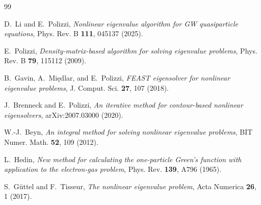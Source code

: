\documentclass[12pt,a4paper]{article}
\theoremstyle{definition}
\begin{document}
\begin{thebibliography}{99}

D.~Li and E.~Polizzi,
\emph{Nonlinear eigenvalue algorithm for GW quasiparticle equations},
Phys. Rev. B \textbf{111}, 045137 (2025).

E.~Polizzi,
\emph{Density-matrix-based algorithm for solving eigenvalue problems},
Phys. Rev. B \textbf{79}, 115112 (2009).

B.~Gavin, A.~Międlar, and E.~Polizzi,
\emph{FEAST eigensolver for nonlinear eigenvalue problems},
J. Comput. Sci. \textbf{27}, 107 (2018).

J.~Brenneck and E.~Polizzi,
\emph{An iterative method for contour-based nonlinear eigensolvers},
arXiv:2007.03000 (2020).

W.-J.~Beyn,
\emph{An integral method for solving nonlinear eigenvalue problems},
BIT Numer. Math. \textbf{52}, 109 (2012).

L.~Hedin,
\emph{New method for calculating the one-particle Green's function with application to the electron-gas problem},
Phys. Rev. \textbf{139}, A796 (1965).

S.~G\"{u}ttel and F.~Tisseur,
\emph{The nonlinear eigenvalue problem},
Acta Numerica \textbf{26}, 1 (2017).

\end{thebibliography}
\end{document}
